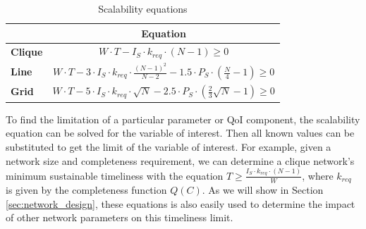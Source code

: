 \begin{table}[]
\centering
\begin{tabular}{l|l|}
\cline{2-2}
                             & \multicolumn{1}{c|}{{\bf Equation}} \\ \hline
\multicolumn{1}{|l|}{\textbf{Clique}} & \multicolumn{1}{c|}{$W \cdot T - I_S \cdot k_{req} \cdot (N-1) \geq 0$}            \\ \hline
\multicolumn{1}{|l|}{\textbf{Line}}   & \multicolumn{1}{c|}{$W \cdot T - 3 \cdot I_S \cdot k_{req} \cdot \frac{(N-1)^2}{N-2} - 1.5 \cdot P_S \cdot (\frac{N}{4}-1) \geq 0$}       \\ \hline
\multicolumn{1}{|l|}{\textbf{Grid}}   & \multicolumn{1}{c|}{$W \cdot T - 5 \cdot I_S \cdot k_{req} \cdot \sqrt{N} - 2.5 \cdot P_S \cdot (\frac{2}{3}\sqrt{N} - 1) \geq 0$}      \\ \hline
\end{tabular}
\caption{Scalability equations}
\label{table:scal_eqs}
\end{table}

To find the limitation of a particular parameter or QoI component, the scalability equation can be solved for the variable of interest.  Then all known values can be substituted to get the limit of the variable of interest.  For example, given a network size and completeness requirement, we can determine a clique network's minimum sustainable timeliness with the equation $T  \geq \frac{I_S \cdot k_{req} \cdot (N-1)}{W}$, where $k_{req}$ is given by the completeness function $Q(C)$.  As we will show in Section \ref{sec:network_design}, these equations is also easily used to determine the impact of other network parameters on this timeliness limit. 

%
%

